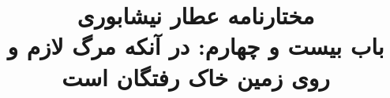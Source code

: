 \documentclass[14pt,b5paper]{article}
\begin{document}
\title{\Huge مختارنامه عطار نیشابوری \\
باب بیست و چهارم: در آنکه مرگ لازم و روی زمین خاک رفتگان است}
\author{ }
\date{ }
\maketitle
\newpage
\tableofcontents
\newpage

\newpage

\newpage

\newpage

\newpage

\newpage

\newpage

\newpage

\newpage

\newpage

\newpage

\newpage

\newpage

\newpage

\newpage

\newpage

\newpage

\newpage

\newpage

\newpage

\newpage

\newpage

\newpage

\newpage

\newpage

\newpage

\newpage

\newpage

\newpage

\newpage

\newpage

\newpage

\newpage

\newpage

\newpage

\newpage

\newpage

\newpage

\newpage

\newpage

\newpage

\newpage

\newpage

\newpage
\end{document}
